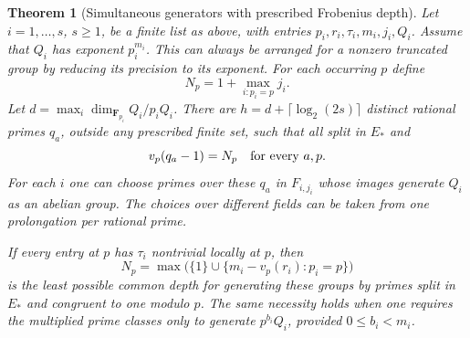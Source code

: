 \documentclass[a4paper,11pt]{article}
\newtheorem{theorem}[proposition]{Theorem}
\theoremstyle{definition}
\theoremstyle{remark}
\numberwithin{equation}{section}
\begin{document}
\begin{theorem}[Simultaneous generators with prescribed Frobenius depth]
\leavevmode\label{thm:exactclassprimes652}
Let \(i=1,\ldots,s\), \(s\ge1\), be a finite list as above,
with entries \(p_i,r_i,\tau_i,m_i,j_i,Q_i\). Assume that
\(Q_i\) has exponent \(p_i^{m_i}\). This can always be
arranged for a nonzero truncated group by reducing its
precision to its exponent. For each occurring \(p\) define
\[
              N_p=1+\max_{i:p_i=p}j_i .
\]
Let \(d=\max_i\dim_{\mathbf F_{p_i}} Q_i/p_iQ_i\).
There are \(h=d+\lceil\log_2(2s)\rceil\) distinct rational
primes \(q_a\), outside any prescribed finite set, such that
all split in \(E_*\) and
\[
 v_p(q_a-1)=N_p\quad\hbox{for every }a,p .
\]
For each \(i\) one can choose primes over these \(q_a\) in
\(F_{i,j_i}\) whose images generate \(Q_i\) as an abelian
group. The choices over different fields can be taken from
one prolongation per rational prime.

If every entry at \(p\) has \(\tau_i\) nontrivial locally
at \(p\), then
\[
           N_p=\max\bigl(\{1\}\cup
                    \{m_i-v_p(r_i):p_i=p\}\bigr)
\]
is the least possible common depth for generating these
groups by primes split in \(E_*\) and congruent to one
modulo \(p\). The same necessity holds when one requires the
multiplied prime classes only to generate \(p^{b_i}Q_i\),
provided \(0\le b_i<m_i\).
\end{theorem}
\end{document}
